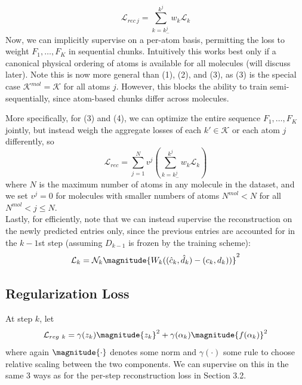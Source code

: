 \documentclass[12pt]{article}
\begin{document}
\begin{itemize}
        \begin{equation}
            \mathcal{L}_{rec \ j} =  \sum_{k=k^j_-}^{k^j} w_k \mathcal{L}_k
        \end{equation}
        Now, we can implicitly supervise on a per-atom basis, permitting the loss to weight $F_1, \ldots, F_K$ in sequential chunks. Intuitively this works best only if a canonical physical ordering of atoms is available for all molecules (will discuss later). Note this is now more general than (1), (2), and (3), as (3) is the special case $\mathcal{K}^{mol} = \mathcal{K}$ for all atoms $j$. However, this blocks the ability to train semi-sequentially, since atom-based chunks differ across molecules.
    \end{itemize}

    More specifically, for (3) and (4), we can optimize the entire sequence $F_1, \ldots, F_K$ jointly, but instead weigh the aggregate losses of each $k' \in \mathcal{K}$ or each atom $j$ differently, so
    \begin{equation} 
        \mathcal{L}_{rec} = \sum_{j=1}^N v^j \left( \sum_{k=k_-^{j}}^{k^j} w_k \mathcal{L}_k \right)
    \end{equation}
    where $N$ is the maximum number of atoms in any molecule in the dataset, and we set $v^j = 0$ for molecules with smaller numbers of atoms $N^{mol} < N$ for all $N^{mol} < j \leq N$. \\[-6pt]
    
    Lastly, for efficiently, note that we can instead supervise the reconstruction on the newly predicted entries only, since the previous entries are accounted for in the $k-1$st step (assuming $D_{k-1}$ is frozen by the training scheme):
    \begin{equation}
        \mathcal{L}_k = \mathcal{N}_k \magnitude{W_k ((\hat c_k, \hat d_k) - (c_k, d_k))}^2
    \end{equation}

    \subsection{Regularization Loss}
    At step $k$, let
    \begin{equation}
        \mathcal{L}_{reg \ k} = \gamma(z_k) \magnitude{z_k}^2 + \gamma(\alpha_k)\magnitude{f(\alpha_k)}^2
    \end{equation}
    where again $\magnitude{\cdot}$ denotes some norm and $\gamma(\cdot)$ some rule to choose relative scaling between the two components. We can supervise on this in the same 3 ways as for the per-step reconstruction loss in Section 3.2. 
\end{document}
